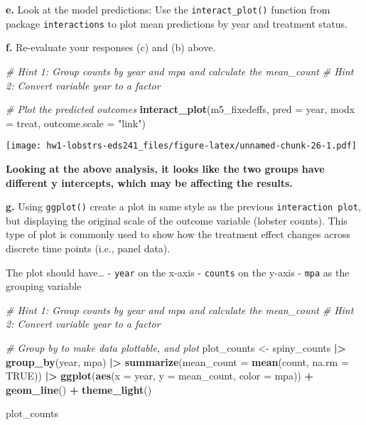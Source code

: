 \documentclass[
]{article}
\newenvironment{Shaded}{\begin{snugshade}}{\end{snugshade}}
\newcommand{\AttributeTok}[1]{\textcolor[rgb]{0.13,0.29,0.53}{#1}}
\newcommand{\CommentTok}[1]{\textcolor[rgb]{0.56,0.35,0.01}{\textit{#1}}}
\newcommand{\ConstantTok}[1]{\textcolor[rgb]{0.56,0.35,0.01}{#1}}
\newcommand{\FunctionTok}[1]{\textcolor[rgb]{0.13,0.29,0.53}{\textbf{#1}}}
\newcommand{\NormalTok}[1]{#1}
\newcommand{\OtherTok}[1]{\textcolor[rgb]{0.56,0.35,0.01}{#1}}
\newcommand{\SpecialCharTok}[1]{\textcolor[rgb]{0.81,0.36,0.00}{\textbf{#1}}}
\newcommand{\StringTok}[1]{\textcolor[rgb]{0.31,0.60,0.02}{#1}}
\begin{document}
\textbf{e.} Look at the model predictions: Use the
\texttt{interact\_plot()} function from package \texttt{interactions} to
plot mean predictions by year and treatment status.

\textbf{f.} Re-evaluate your responses (c) and (b) above.

\begin{Shaded}
\begin{Highlighting}[]
\CommentTok{\# Hint 1: Group counts by \textasciigrave{}year\textasciigrave{} and \textasciigrave{}mpa\textasciigrave{} and calculate the \textasciigrave{}mean\_count\textasciigrave{}}
\CommentTok{\# Hint 2: Convert variable \textasciigrave{}year\textasciigrave{} to a factor}

\CommentTok{\# Plot the predicted outcomes}
\FunctionTok{interact\_plot}\NormalTok{(m5\_fixedeffs, }\AttributeTok{pred =}\NormalTok{ year, }\AttributeTok{modx =}\NormalTok{ treat,}
              \AttributeTok{outcome.scale =} \StringTok{"link"}\NormalTok{)}
\end{Highlighting}
\end{Shaded}

\texttt{[image: hw1-lobstrs-eds241\_files/figure-latex/unnamed-chunk-26-1.pdf]}

\textbf{Looking at the above analysis, it looks like the two groups have
different y intercepts, which may be affecting the results.}

\textbf{g.} Using \texttt{ggplot()} create a plot in same style as the
previous \texttt{interaction\ plot}, but displaying the original scale
of the outcome variable (lobster counts). This type of plot is commonly
used to show how the treatment effect changes across discrete time
points (i.e., panel data).

The plot should have\ldots{} - \texttt{year} on the x-axis -
\texttt{counts} on the y-axis - \texttt{mpa} as the grouping variable

\begin{Shaded}
\begin{Highlighting}[]
\CommentTok{\# Hint 1: Group counts by \textasciigrave{}year\textasciigrave{} and \textasciigrave{}mpa\textasciigrave{} and calculate the \textasciigrave{}mean\_count\textasciigrave{}}
\CommentTok{\# Hint 2: Convert variable \textasciigrave{}year\textasciigrave{} to a factor}

\CommentTok{\# Group by to make data plottable, and plot}
\NormalTok{plot\_counts }\OtherTok{\textless{}{-}}\NormalTok{ spiny\_counts }\SpecialCharTok{|\textgreater{}}
    \FunctionTok{group\_by}\NormalTok{(year, mpa) }\SpecialCharTok{|\textgreater{}}
    \FunctionTok{summarize}\NormalTok{(}\AttributeTok{mean\_count =} \FunctionTok{mean}\NormalTok{(count, }\AttributeTok{na.rm =} \ConstantTok{TRUE}\NormalTok{)) }\SpecialCharTok{|\textgreater{}}
    \FunctionTok{ggplot}\NormalTok{(}\FunctionTok{aes}\NormalTok{(}\AttributeTok{x =}\NormalTok{ year, }\AttributeTok{y =}\NormalTok{ mean\_count, }\AttributeTok{color =}\NormalTok{ mpa)) }\SpecialCharTok{+}
    \FunctionTok{geom\_line}\NormalTok{() }\SpecialCharTok{+}
    \FunctionTok{theme\_light}\NormalTok{()}

\NormalTok{plot\_counts}
\end{Highlighting}
\end{Shaded}
\end{document}
